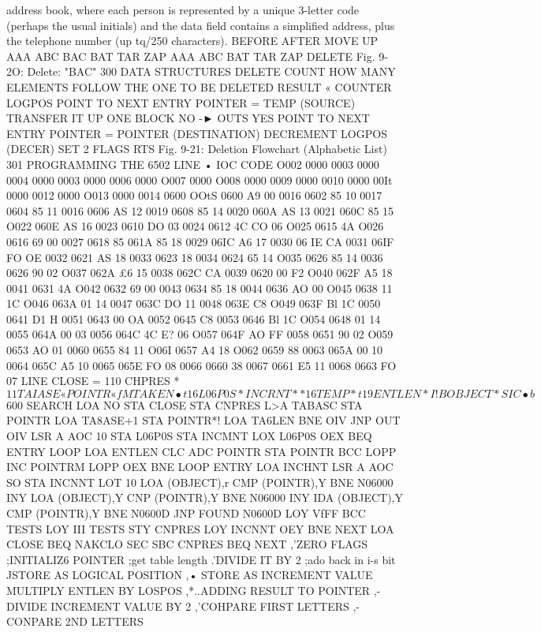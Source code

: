 {{{{{{{{{address book, where each person is represented by a unique
3-letter code (perhaps the usual initials) and the data field contains
a simplified address, plus the telephone number (up tq/250
characters).
BEFORE AFTER
MOVE UP
AAA
ABC
BAC
BAT
TAR
ZAP
AAA
ABC
BAT
TAR
ZAP
DELETE
Fig. 9-2O: Delete: "BAC"
300
DATA STRUCTURES
DELETE
COUNT HOW MANY
ELEMENTS FOLLOW THE
ONE TO BE DELETED
RESULT « COUNTER
LOGPOS
POINT TO NEXT ENTRY
POINTER = TEMP (SOURCE)
TRANSFER IT UP ONE BLOCK
NO
-► OUTS
YES
POINT TO NEXT ENTRY
POINTER = POINTER (DESTINATION)
DECREMENT LOGPOS
(DECER)
SET 2 FLAGS
RTS
Fig. 9-21: Deletion Flowchart (Alphabetic List)
301
PROGRAMMING THE 6502
LINE • IOC CODE
O002 0000
0003 0000
0004 0000
0003 0000
0006 0000
O007 0000
O008 0000
0009 0000
0010 0000
00It 0000
0012 0000
O013 0000
0014 0600
OOtS 0600 A9 00
0016 0602 85 10
0017 0604 85 11
0016 0606 AS 12
0019 0608 85 14
0020 060A AS 13
0021 060C 85 15
O022 060E AS 16
0023 0610 DO 03
0024 0612 4C CO 06
O025 0615 4A
O026 0616 69 00
0027 0618 85  061A 85 18
0029 06IC A6 17
0030 06 IE CA
0031 06IF FO OE
0032 0621 AS 18
0033 0623 18
0034 0624 65 14
O035 0626 85 14
0036 0626 90 02
O037 062A £6 15
0038 062C CA
0039 0620 00 F2
O040 062F A5 18
0041 0631 4A
O042 0632 69 00
0043 0634 85 18
0044 0636 AO 00
O045 0638 11 1C
O046 063A 01 14
0047 063C DO 11
0048 063E C8
O049 063F Bl 1C
0050 0641 D1 H
0051 0643 00 OA
0052 0645 C8
0053 0646 Bl 1C
O054 0648 01 14
0055 064A 00 03
0056 064C 4C E? 06
O057 064F AO FF
0058 0651 90 02
O059 0653 AO 01
0060 0655 84 11
O06I 0657 A4 18
O062 0659 88
0063 065A 00 10
0064 065C A5 10
0065 065E FO 08
0066 0660 38
0067 0661 E5 11
0068 0663 FO 07
LINE
CLOSE = 110
CHPRES * $11
TAIASE « %
POINTR « fM
TAKEN • t16
L06P0S * %
INCRNT * *16
TEMP * t19
ENTLEN * I!B
OBJECT * SIC
• b $600
SEARCH LOA NO
STA CLOSE
STA CNPRES
L>A TABASC
STA POINTR
LOA TA8ASE+1
STA POINTR*!
LOA TA6LEN
BNE OIV
JNP OUT
OIV LSR A
AOC 10
STA L06P0S
STA INCMNT
LOX L06P0S
OEX
BEQ ENTRY
LOOP LOA ENTLEN
CLC
ADC POINTR
STA POINTR
BCC LOPP
INC POINTRM
LOPP OEX
BNE LOOP
ENTRY LOA INCHNT
LSR A
AOC SO
STA INCNNT
LOT 10
LOA (OBJECT),r
CMP (POINTR),Y
BNE N06000
INY
LOA (OBJECT),Y
CNP (POINTR),Y
BNE N06000
INY
IDA (OBJECT),Y
CMP (POINTR),Y
BNE N0600D
JNP FOUND
N0600D LOY VfFF
BCC TESTS
LOY III
TESTS STY CNPRES
LOY INCNNT
OEY
BNE NEXT
LOA CLOSE
BEQ NAKCLO
SEC
SBC CNPRES
BEQ NEXT
,'ZERO FLAGS
;INITIALIZ6 POINTER
;get table length
.'DIVIDE IT BY 2
;ado back in i-s bit
JSTORE AS LOGICAL POSITION
,• STORE AS INCREMENT VALUE
MULTIPLY ENTLEN BY LOSPOS
,*..ADDING RESULT TO POINTER
,-DIVIDE INCREMENT VALUE BY 2
,'COHPARE FIRST LETTERS
,-CONPARE 2ND LETTERS
}}}}}}}}}
